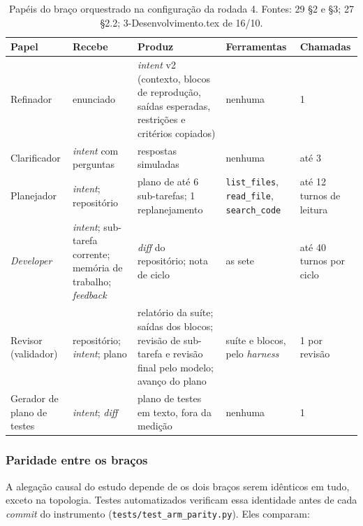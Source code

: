 \begin{table}[t]
\centering
\caption{Papéis do braço orquestrado na configuração da rodada 4. Fontes: 29 \S2 e \S3; 27 \S2.2; 3-Desenvolvimento.tex de 16/10.}
\label{tab-papeis}
\footnotesize
\begin{tabular}{lp{3.0cm}p{3.8cm}p{2.3cm}p{2.1cm}}
\toprule
Papel & Recebe & Produz & Ferramentas & Chamadas \\
\midrule
Refinador & enunciado & \textit{intent} v2 (contexto, blocos de reprodução, saídas esperadas, restrições e critérios copiados) & nenhuma & 1 \\
Clarificador & \textit{intent} com perguntas & respostas simuladas & nenhuma & até 3 \\
Planejador & \textit{intent}; repositório & plano de até 6 sub-tarefas; 1 replanejamento & \texttt{list\_files}, \texttt{read\_file}, \texttt{search\_code} & até 12 turnos de leitura \\
\textit{Developer} & \textit{intent}; sub-tarefa corrente; memória de trabalho; \textit{feedback} & \textit{diff} do repositório; nota de ciclo & as sete & até 40 turnos por ciclo \\
Revisor (validador) & repositório; \textit{intent}; plano & relatório da suíte; saídas dos blocos; revisão de sub-tarefa e revisão final pelo modelo; avanço do plano & suíte e blocos, pelo \textit{harness} & 1 por revisão \\
Gerador de plano de testes & \textit{intent}; \textit{diff} & plano de testes em texto, fora da medição & nenhuma & 1 \\
\bottomrule
\end{tabular}
\end{table}

\subsubsection{Paridade entre os braços}

A alegação causal do estudo depende de os dois braços serem idênticos em tudo, exceto na topologia. Testes automatizados verificam essa identidade antes de cada \textit{commit} do instrumento (\texttt{tests/test\_arm\_parity.py}). Eles comparam:

